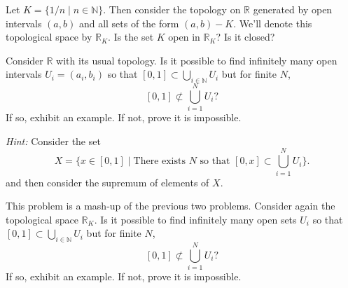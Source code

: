 \documentclass[12pt]{pset}
\newcommand{\NN}{\mathbb{N}}
\newcommand{\RR}{\mathbb{R}}
\begin{document}
\pagebreak

\begin{problem}

  Let $K = \{ 1/n \mid n \in \NN \}$.  Then consider the topology on
  $\RR$ generated by open intervals $(a,b)$ and all sets of the
  form $(a,b) - K$.  We'll denote this topological space by $\RR_K$.
  Is the set $K$ open in $\RR_K$?  Is it closed?

\end{problem}

\begin{problem}

  Consider $\RR$ with its usual topology.  Is it possible to find
  infinitely many open intervals $U_i = (a_i,b_i)$ so that
  $[0,1] \subset \displaystyle\bigcup_{i \in \NN} U_i$ but for finite $N$,
  \[
  [0,1] \not\subset \bigcup_{i = 1}^N U_i?
  \]
  If so, exhibit an example.  If not, prove it is impossible.

  \vspace{1ex}
  \noindent\textit{Hint:}  Consider the set 
  \[
  X = \{ x \in [0,1] \mid \mbox{There exists $N$ so that } [0,x] \subset \bigcup_{i = 1}^N U_i \}.
  \]
  and then consider the supremum of elements of $X$.

\end{problem}

\begin{problem}

  This problem is a mash-up of the previous two problems. Consider
  again the topological space $\RR_K$.  Is it possible to find
  infinitely many open sets $U_i$ so that
  $[0,1] \subset \displaystyle\bigcup_{i \in \NN} U_i$ but for finite
  $N$,
  \[
  [0,1] \not\subset \bigcup_{i = 1}^N U_i?
  \]
  If so, exhibit an example. If not, prove it is impossible.

\end{problem}
\end{document}
